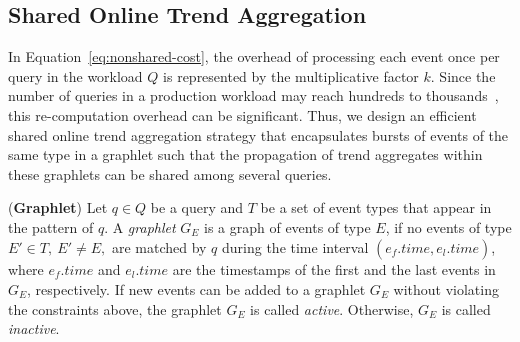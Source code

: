 



\subsection{Shared Online Trend Aggregation}
\label{sec:shared-approach}

In Equation~\ref{eq:nonshared-cost}, the overhead of processing each event once per query in the workload $Q$ is represented by the multiplicative factor $k$. 
Since the number of queries in a production workload may reach hundreds to thousands~\cite{ADLS, shared_clouds}, this re-computation overhead can be significant.
Thus, we design an efficient shared online trend aggregation strategy that encapsulates bursts of events of the same type in a graphlet such that the propagation of trend aggregates  within these graphlets can be shared among several queries. 


\begin{definition}(\textbf{Graphlet})
%
Let $q \in Q$ be a query and $T$ be a set of event types that appear in the pattern of $q$. 
%
A \textit{graphlet} $G_E$ is a graph of events of type $E$, if no events of type $E' \in T,\ E' \neq E,$ are matched by $q$ during the time interval $(e_\mathit{f}.time, e_l.time)$, where $e_\mathit{f}.time$ and $e_l.time$ are the time\-stamps of the first and the last events in $G_E$, respectively.
%
If new events can be added to a graphlet $G_E$ without violating the constraints above, the graphlet $G_E$ is called \textit{active}. Otherwise, $G_E$ is called \textit{inactive}.
%
\label{def:graphlet}
\end{definition}

